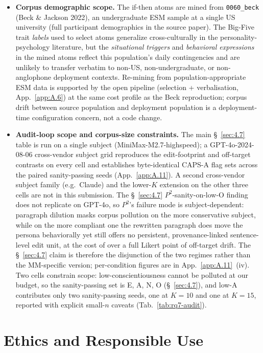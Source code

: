 \begin{itemize}
\item \textbf{Corpus demographic scope.} The if-then atoms are mined from \texttt{0060\_\allowbreak{}beck} (Beck \& Jackson 2022), an undergraduate ESM sample at a single US university (full participant demographics in the source paper). The Big-Five trait \textit{labels} used to select atoms generalize cross-culturally in the personality-psychology literature, but the \textit{situational triggers} and \textit{behavioral expressions} in the mined atoms reflect this population's daily contingencies and are unlikely to transfer verbatim to non-US, non-undergraduate, or non-anglophone deployment contexts. Re-mining from population-appropriate ESM data is supported by the open pipeline (selection + verbalisation, App.~\ref{app:A.6}) at the same cost profile as the Beck reproduction; corpus drift between source population and deployment population is a deployment-time configuration concern, not a code change.
\item \textbf{Audit-loop scope and corpus-size constraints.} The main \S~\ref{sec:4.7} table is run on a single subject (MiniMax-M2.7-highspeed); a GPT-4o-2024-08-06 cross-vendor subject grid reproduces the edit-footprint and off-target contrasts on every cell and establishes byte-identical CAPS-A flag sets across the paired sanity-passing seeds (App.~\ref{app:A.11}). A second cross-vendor subject family (e.g.\ Claude) and the lower-$K$ extension on the other three cells are not in this submission. The \S~\ref{sec:4.7} $P^{\!2}$-sanity-on-low-O finding does not replicate on GPT-4o, so $P^{\!2}$'s failure mode is subject-dependent: paragraph dilution masks corpus pollution on the more conservative subject, while on the more compliant one the rewritten paragraph does move the persona behaviorally yet still offers no persistent, provenance-linked sentence-level edit unit, at the cost of over a full Likert point of off-target drift. The \S~\ref{sec:4.7} claim is therefore the disjunction of the two regimes rather than the MM-specific version; per-condition figures are in App.~\ref{app:A.11}~(iv). Two cells constrain scope: low-conscientiousness cannot be polluted at our budget, so the sanity-passing set is E, A, N, O (\S~\ref{sec:4.7}), and low-A contributes only two sanity-passing seeds, one at $K{=}10$ and one at $K{=}15$, reported with explicit small-$n$ caveats (Tab.~\ref{tab:rq7-audit}).
\end{itemize}

\label{sec:ethics}
\section*{Ethics and Responsible Use}

